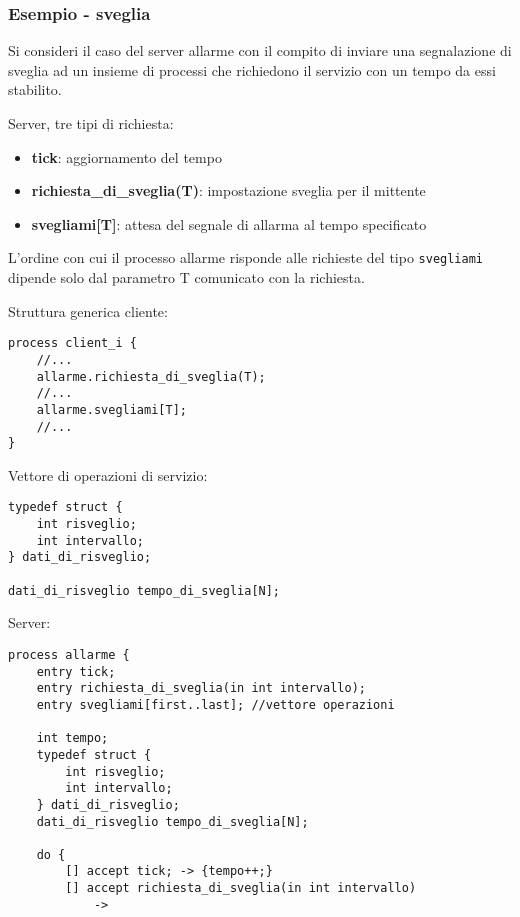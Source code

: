 \subsubsection{Esempio - sveglia}
Si consideri il caso del server allarme con il compito di inviare una segnalazione di sveglia ad un insieme di processi che richiedono il servizio con un tempo da essi stabilito.

Server, tre tipi di richiesta:
\begin{itemize}
    \item \textbf{tick}: aggiornamento del tempo
    \item \textbf{richiesta\_di\_sveglia(T)}: impostazione sveglia per il mittente
    \item \textbf{svegliami[T]}: attesa del segnale di allarma al tempo specificato
\end{itemize}

L'ordine con cui il processo allarme risponde alle richieste del tipo \texttt{svegliami} dipende solo dal parametro T comunicato con la richiesta.

Struttura generica cliente:
\begin{verbatim}
process client_i {
    //...
    allarme.richiesta_di_sveglia(T);
    //...
    allarme.svegliami[T];
    //...
}
\end{verbatim}

Vettore di operazioni di servizio:
\begin{verbatim}
typedef struct {
    int risveglio;
    int intervallo;
} dati_di_risveglio;

dati_di_risveglio tempo_di_sveglia[N];
\end{verbatim}

Server:
\begin{verbatim}
process allarme {
    entry tick;
    entry richiesta_di_sveglia(in int intervallo);
    entry svegliami[first..last]; //vettore operazioni

    int tempo;
    typedef struct {
        int risveglio;
        int intervallo;
    } dati_di_risveglio;
    dati_di_risveglio tempo_di_sveglia[N];

    do {
        [] accept tick; -> {tempo++;}
        [] accept richiesta_di_sveglia(in int intervallo)
            ->
\end{verbatim}

